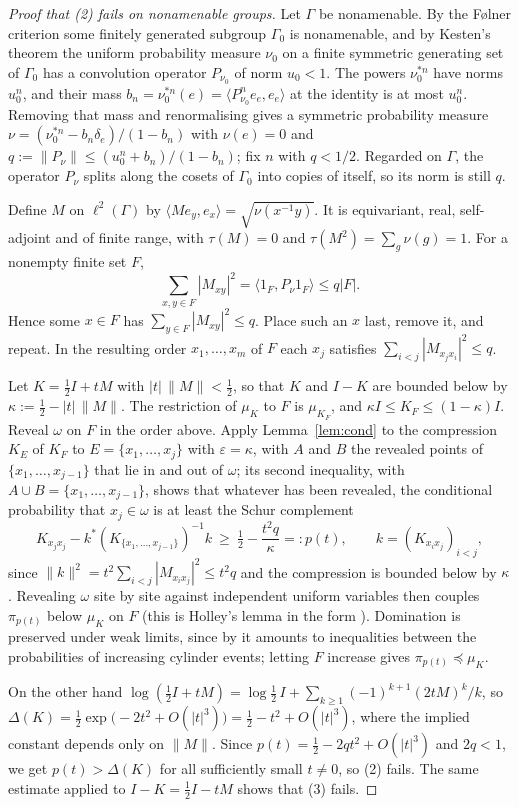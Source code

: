 \documentclass[11pt]{amsart}
\theoremstyle{remark}
\theoremstyle{definition}
\newcommand{\Ga}{\Gamma}
\newcommand{\FK}{\Delta}
\newcommand{\tr}{\tau}
\newcommand{\dom}{\preccurlyeq}
\newcommand{\ltwo}{\ell^2}
\begin{document}
\begin{proof}[Proof that (2) fails on nonamenable groups]
Let $\Ga$ be nonamenable. By the F{\o}lner criterion some finitely generated subgroup $\Ga_0$ is nonamenable, and by
Kesten's theorem \cite{Kes59} the uniform probability measure $\nu_0$ on a finite symmetric generating set of $\Ga_0$
has a convolution operator $P_{\nu_0}$ of norm $u_0<1$. The powers $\nu_0^{*n}$ have norms $u_0^n$, and their mass
$b_n=\nu_0^{*n}(e)=\langle P_{\nu_0}^n e_e,e_e\rangle$ at the identity is at most $u_0^n$. Removing that mass and
renormalising gives a symmetric probability measure $\nu=(\nu_0^{*n}-b_n\delta_e)/(1-b_n)$ with $\nu(e)=0$ and
$q:=\|P_\nu\|\le(u_0^n+b_n)/(1-b_n)$; fix $n$ with $q<1/2$. Regarded on $\Ga$, the operator $P_\nu$ splits along the
cosets of $\Ga_0$ into copies of itself, so its norm is still $q$.

Define $M$ on $\ltwo(\Ga)$ by $\langle Me_y,e_x\rangle=\sqrt{\nu(x^{-1}y)}$. It is equivariant, real, self-adjoint and of
finite range, with $\tr(M)=0$ and $\tr(M^2)=\sum_g\nu(g)=1$. For a nonempty finite set $F$,
\[
\sum_{x,y\in F}|M_{xy}|^2=\langle 1_F,P_\nu 1_F\rangle\le q|F|.
\]
Hence some $x\in F$ has $\sum_{y\in F}|M_{xy}|^2\le q$. Place such an $x$ last, remove it, and repeat. In the
resulting order $x_1,\dots,x_m$ of $F$ each $x_j$ satisfies $\sum_{i<j}|M_{x_jx_i}|^2\le q$.

Let $K=\tfrac12I+tM$ with $|t|\,\|M\|<\tfrac12$, so that $K$ and $I-K$ are bounded below by
$\kappa:=\tfrac12-|t|\,\|M\|$. The restriction of $\mu_K$ to $F$ is $\mu_{K_F}$, and $\kappa I\le K_F\le(1-\kappa)I$.
Reveal $\omega$ on $F$ in the order above. Apply Lemma~\ref{lem:cond} to the compression $K_E$ of $K_F$ to $E=\{x_1,\dots,x_j\}$ with
$\varepsilon=\kappa$, with $A$ and $B$ the revealed points of $\{x_1,\dots,x_{j-1}\}$ that lie in and out of $\omega$; its
second inequality, with $A\cup B=\{x_1,\dots,x_{j-1}\}$, shows that whatever has been revealed, the conditional
probability that $x_j\in\omega$ is at least the Schur complement
\[
K_{x_jx_j}-k^{*}(K_{\{x_1,\dots,x_{j-1}\}})^{-1}k\ \ge\ \tfrac12-\frac{t^2q}{\kappa}=:p(t),
\qquad k=(K_{x_ix_j})_{i<j},
\]
since $\|k\|^2=t^2\sum_{i<j}|M_{x_ix_j}|^2\le t^2q$ and the compression is bounded below by $\kappa$. Revealing
$\omega$ site by site against independent uniform variables then couples $\pi_{p(t)}$ below $\mu_K$ on $F$
(this is Holley's lemma in the form \cite[Lemma~5.2]{LS03}). Domination is preserved under weak limits, since by
\cite{Str65} it amounts to inequalities between the probabilities of increasing cylinder events; letting $F$ increase
gives $\pi_{p(t)}\dom\mu_K$.

On the other hand $\log(\tfrac12 I+tM)=\log\tfrac12\,I+\sum_{k\ge1}(-1)^{k+1}(2tM)^k/k$, so
$\FK(K)=\tfrac12\exp\bigl(-2t^2+O(|t|^3)\bigr)=\tfrac12-t^2+O(|t|^3)$, where the implied constant depends only on
$\|M\|$. Since $p(t)=\tfrac12-2q t^2+O(|t|^3)$ and $2q<1$, we get $p(t)>\FK(K)$ for all sufficiently small
$t\neq0$, so (2) fails. The same estimate applied to $I-K=\tfrac12I-tM$ shows that (3) fails.
\end{proof}
\end{document}
